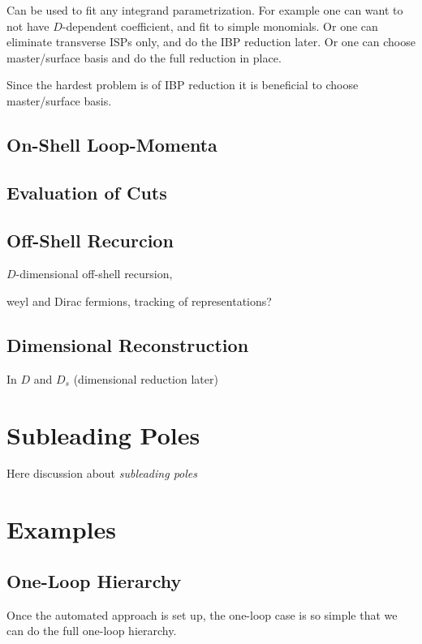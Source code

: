 Can be used to fit any integrand parametrization. For example one
can want to not have $D$-dependent coefficient, and fit to simple monomials.
Or one can eliminate transverse ISPs only, and do the IBP reduction later.
Or one can choose master/surface basis and do the full reduction in place.

Since the hardest problem is of IBP reduction it is beneficial to choose master/surface basis.

\subsection{On-Shell Loop-Momenta}


\subsection{Evaluation of Cuts}

\subsection{Off-Shell Recurcion}
\label{sec:BG_recursion}

$D$-dimensional off-shell recursion,


weyl and Dirac fermions,
tracking of representations?


\subsection{Dimensional Reconstruction}
 In $D$ and $D_s$ (dimensional reduction later)


\section{Subleading Poles}
Here discussion about \textit{subleading poles}



\section{Examples}

\subsection{One-Loop Hierarchy}

Once the automated approach is set up, the one-loop case is so simple that we can
do the full one-loop hierarchy.

